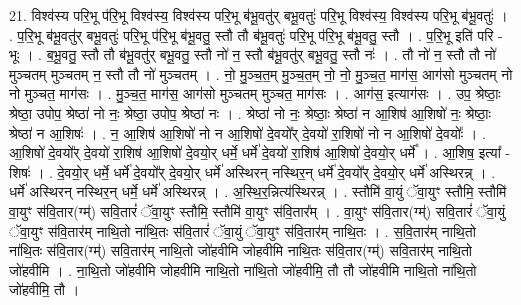 \documentclass[17pt]{extarticle}
\begin{document}
21. विश्व॑स्य परि॒भू प॑रि॒भू विश्व॑स्य॒ विश्व॑स्य परि॒भू ब॑भू॒वतु॑र् बभू॒वतुः॑ परि॒भू विश्व॑स्य॒ विश्व॑स्य परि॒भू ब॑भू॒वतुः॑ । . प॒रि॒भू ब॑भू॒वतु॑र् बभू॒वतुः॑ परि॒भू प॑रि॒भू ब॑भू॒वतु॒ स्तौ तौ ब॑भू॒वतुः॑ परि॒भू प॑रि॒भू ब॑भू॒वतु॒ स्तौ । . प॒रि॒भू इति॑ परि - भूः । . ब॒भू॒वतु॒ स्तौ तौ ब॑भू॒वतु॑र् बभू॒वतु॒ स्तौ नो॑ न॒ स्तौ ब॑भू॒वतु॑र् बभू॒वतु॒ स्तौ नः॑ । . तौ नो॑ न॒ स्तौ तौ नो॑ मुञ्चतम् मुञ्चतम् न॒ स्तौ तौ नो॑ मुञ्चतम् । . नो॒ मु॒ञ्च॒त॒म् मु॒ञ्च॒त॒म् नो॒ नो॒ मु॒ञ्च॒त॒ माग॑स॒ आग॑सो मुञ्चतम् नो नो मुञ्चत॒ माग॑सः । . मु॒ञ्च॒त॒ माग॑स॒ आग॑सो मुञ्चतम् मुञ्चत॒ माग॑सः । . आग॑स॒ इत्याग॑सः । . उप॒ श्रेष्ठाः॒ श्रेष्ठा॒ उपोप॒ श्रेष्ठा॑ नो नः॒ श्रेष्ठा॒ उपोप॒ श्रेष्ठा॑ नः । . श्रेष्ठा॑ नो नः॒ श्रेष्ठाः॒ श्रेष्ठा॑ न आ॒शिष॑ आ॒शिषो॑ नः॒ श्रेष्ठाः॒ श्रेष्ठा॑ न आ॒शिषः॑ । . न॒ आ॒शिष॑ आ॒शिषो॑ नो न आ॒शिषो॑ दे॒वयो᳚र् दे॒वयो॑ रा॒शिषो॑ नो न आ॒शिषो॑ दे॒वयोः᳚ । . आ॒शिषो॑ दे॒वयो᳚र् दे॒वयो॑ रा॒शिष॑ आ॒शिषो॑ दे॒वयो॒र् धर्मे॒ धर्मे॑ दे॒वयो॑ रा॒शिष॑ आ॒शिषो॑ दे॒वयो॒र् धर्मे᳚ । . आ॒शिष॒ इत्या᳚ - शिषः॑ । . दे॒वयो॒र् धर्मे॒ धर्मे॑ दे॒वयो᳚र् दे॒वयो॒र् धर्मे॑ अस्थिरन् नस्थिर॒न् धर्मे॑ दे॒वयो᳚र् दे॒वयो॒र् धर्मे॑ अस्थिरन्न् । . धर्मे॑ अस्थिरन् नस्थिर॒न् धर्मे॒ धर्मे॑ अस्थिरन्न् । . अ॒स्थि॒र॒न्नित्य॑स्थिरन्न् । . स्तौमि॑ वा॒युं ॅवा॒युꣳ स्तौमि॒ स्तौमि॑ वा॒युꣳ स॑वि॒तार(ग्म्॑) सवि॒तारं॑ ॅवा॒युꣳ स्तौमि॒ स्तौमि॑ वा॒युꣳ स॑वि॒तार᳚म् । . वा॒युꣳ स॑वि॒तार(ग्म्॑) सवि॒तारं॑ ॅवा॒युं ॅवा॒युꣳ स॑वि॒तार॑म् नाथि॒तो ना॑थि॒तः स॑वि॒तारं॑ ॅवा॒युं ॅवा॒युꣳ स॑वि॒तार॑म् नाथि॒तः । . स॒वि॒तार॑म् नाथि॒तो ना॑थि॒तः स॑वि॒तार(ग्म्॑) सवि॒तार॑म् नाथि॒तो जो॑हवीमि जोहवीमि नाथि॒तः स॑वि॒तार(ग्म्॑) सवि॒तार॑म् नाथि॒तो जो॑हवीमि । . ना॒थि॒तो जो॑हवीमि जोहवीमि नाथि॒तो ना॑थि॒तो जो॑हवीमि॒ तौ तौ जो॑हवीमि नाथि॒तो ना॑थि॒तो जो॑हवीमि॒ तौ । \newline
\end{document}
